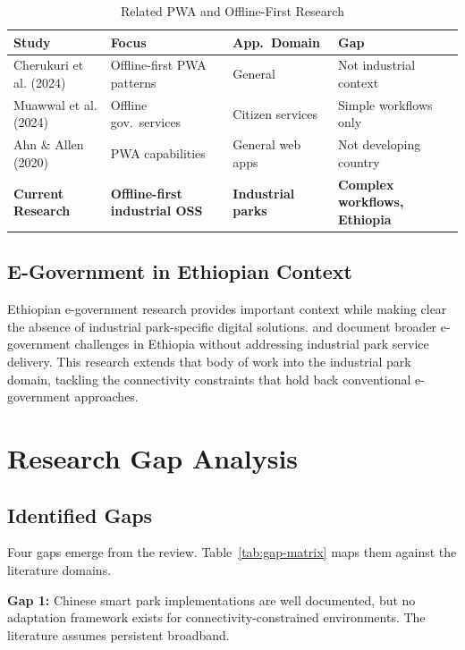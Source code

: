 \begin{table}[H]
\centering
\caption{Related PWA and Offline-First Research}
\label{tab:related-pwa}
\begin{tabular}{p{3.5cm}p{2.5cm}p{3.0cm}p{3.0cm}}
\toprule
\textbf{Study} & \textbf{Focus} & \textbf{App.\ Domain} & \textbf{Gap} \\
\midrule
Cherukuri et al. (2024) & Offline-first PWA patterns & General & Not industrial context \\
Muawwal et al. (2024) & Offline gov.\ services & Citizen services & Simple workflows only \\
Ahn \& Allen (2020) & PWA capabilities & General web apps & Not developing country \\
\textbf{Current Research} & \textbf{Offline-first industrial OSS} & \textbf{Industrial parks} & \textbf{Complex workflows, Ethiopia} \\
\bottomrule
\end{tabular}
\end{table}

\subsection{E-Government in Ethiopian Context}

Ethiopian e-government research provides important context while making clear the absence of industrial park-specific digital solutions. \citet{Lessa2019} and \citet{Denbu2019} document broader e-government challenges in Ethiopia without addressing industrial park service delivery. This research extends that body of work into the industrial park domain, tackling the connectivity constraints that hold back conventional e-government approaches.

\section{Research Gap Analysis}

\subsection{Identified Gaps}

Four gaps emerge from the review. Table~\ref{tab:gap-matrix} maps them against the literature domains.

\textbf{Gap 1:} Chinese smart park implementations are well documented, but no adaptation framework exists for connectivity-constrained environments. The literature assumes persistent broadband.

